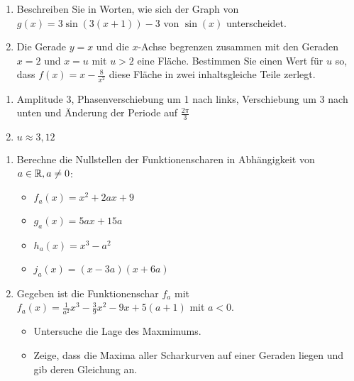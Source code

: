 \begin{enumerate}
	\item Beschreiben Sie in Worten, wie sich der Graph von $g(x)=3\sin(3(x+1))-3$ von $\sin(x)$ unterscheidet.
	\item Die Gerade $y=x$ und die $x$-Achse begrenzen zusammen mit den Geraden $x=2$ und $x=u$ mit $u>2$ eine Fläche. Bestimmen Sie einen Wert für $u$ so, dass $f(x)=x-\frac{8}{x^2}$ diese Fläche in zwei inhaltsgleiche Teile zerlegt. \cas
\end{enumerate}
\begin{lsg}{}
  \begin{enumerate}
		\item Amplitude 3, Phasenverschiebung um 1 nach links, Verschiebung um 3 nach unten und Änderung der Periode auf $\frac{2\pi}{3}$
    \item $u\approx 3,12$
  \end{enumerate}
\end{lsg}


\begin{enumerate}
  \item Berechne die Nullstellen der Funktionenscharen in Abhängigkeit von $a\in \mathbb{R}, a\neq 0$:
  \begin{itemize}
    \item $f_a(x)=x^2+2ax+9$
    \item $g_a(x)=5ax+15a$
    \item $h_a(x)=x^3-a^2$
    \item $j_a(x)=(x-3a)(x+6a)$
  \end{itemize}
  \item Gegeben ist die Funktionenschar $f_a$ mit $f_a(x)=\frac{1}{a^2}x^3-\frac{3}{9}x^2-9x+5(a+1)$ mit $a<0$.
  \begin{itemize}
    \item Untersuche die Lage des Maxmimums.
    \item Zeige, dass die Maxima aller Scharkurven auf einer Geraden liegen und gib deren Gleichung an.
  \end{itemize}
\end{enumerate}

